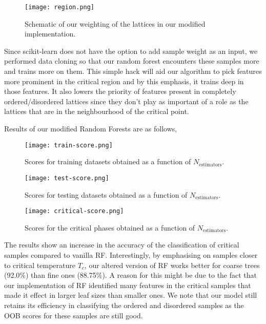 \begin{figure}[H]
    \centering
    \texttt{[image: region.png]}
    \caption{Schematic of our weighting of the lattices in our modified implementation.}
\end{figure}

Since scikit-learn does not have the option to add sample weight as an input, we performed data cloning so that our random forest encounters these samples more and trains more on them. This simple hack will aid our algorithm to pick features more prominent in the critical region and by this emphasis, it trains deep in those features. It also lowers the priority of features present in completely ordered/disordered lattices since they don’t play as important of a role as the lattices that are in the neighbourhood of the critical point.

Results of our modified Random Forests are as follows,

\begin{figure}[h!]
    \centering
    \texttt{[image: train-score.png]}
    \caption{Scores for training datasets obtained as a function of \( N_{\text{estimators}} \).}
\end{figure}

\begin{figure}[h!]
    \centering
    \texttt{[image: test-score.png]}
    \caption{Scores for testing datasets obtained as a function of \( N_{\text{estimators}} \).}
\end{figure}

\begin{figure}[h!]
    \centering
    \texttt{[image: critical-score.png]}
    \caption{Scores for the critical phases obtained as a function of \( N_{\text{estimators}} \).}
\end{figure}

The results show an increase in the accuracy of the classification of critical samples compared to vanilla RF. Interestingly, by emphasising on samples closer to critical temperature $T_c$, our altered version of RF works better
for coarse trees (92.0\%) than fine ones (88.75\%). A reason for this might be due to the fact that our implementation of RF identified many features in the critical samples that made it effect in larger leaf sizes than smaller ones. We note that our model still retains its efficiency in classifying the ordered and disordered samples as the OOB scores for these samples are still good.
